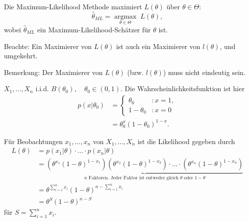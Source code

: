 \documentclass{tstextbook}
\begin{document}
Die Maximum-Likelihood Methode  maximiert $ L(\theta) $ über $ \theta\in\Theta $: \\
\[
\hat{\theta}_{ML} = \underset{\theta\in\Theta}{\operatorname{argmax}} \; L(\theta),
\]
wobei $ \hat{\theta}_{ML} $ ein Maximum-Likelihood-Schätzer für $ \theta $ ist. 

\begin{remark}
	Beachte: Ein Maximierer von $ L(\theta) $ ist auch ein Maximierer von $ l(\theta) $, und umgekehrt.
\end{remark}

\begin{remark}
	Bemerkung: Der Maximierer von $ L(\theta) $ (bzw. $ l(\theta) $) muss nicht eindeutig sein.
\end{remark}

\begin{example}
	$ X_1,\ldots,X_n $ i.i.d. $ B(\theta_0), \quad \theta_0 \in (0,1) $. Die Wahrscheinlichkeitsfunktion ist hier 
	\[
	\begin{aligned}
	p(x|\theta_0) & =\left\{\begin{array}{ll}
		\theta_0 & \colon x=1, \\
		1-\theta_0 & \colon x=0 \end{array}\right .\\
	& = \theta_0^x(1-\theta_0)^{1-x}.
	\end{aligned}
	\]
	
	Für Beobachtungen $ x_1,\ldots,x_n $ von $ X_1,\ldots,X_n $ ist die Likelihood gegeben durch 
	\[
	\begin{aligned}
		L(\theta) & = p(x_1|\theta)\cdot\ldots\cdot p(x_n|\theta) \\
		& = \underbrace{\left(\theta^{x_1}(1-\theta)^{1-x_1}\right)\left(\theta^{x_2}(1-\theta)^{1-x_2}\right)\cdot\ldots\cdot \left(\theta^{x_n}(1-\theta)^{1-x_n}\right)}_{n \text{ Faktoren. Jeder Faktor ist entweder gleich }\theta \text{ oder } 1-\theta} \\
		& = \theta^{\sum_{i=1}^{n}x_i}(1-\theta)^{n-\sum_{i=1}^{n}x_i} \\
		& = \theta^S (1-\theta)^{n-S}
	\end{aligned}
	\] 
	für $ S = \sum_{i=1}^{n}x_i $.
	

\end{example}
\end{document}
